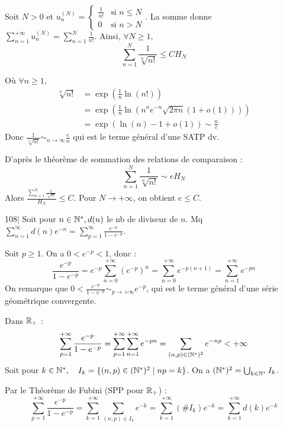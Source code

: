 \begin{solution}
Soit $N > 0$ et $u_n^{(N)} = \begin{cases} \frac{1}{n!} & \text{si } n \leq N \\ 0 & \text{si } n > N \end{cases}$.
La somme donne $\sum_{n=1}^{+\infty} u_n^{(N)} = \sum_{n=1}^N \frac{1}{n!}$.
Ainsi, $\forall N \geq 1$,
\[ \sum_{n=1}^N \frac{1}{\sqrt[n]{n!}} \leq C H_N \]

Où $\forall n \geq 1$, 
\begin{align*}
\sqrt[n]{n!} &= \exp\left(\frac{1}{n}\ln(n!)\right) \\
&= \exp\left(\frac{1}{n}\ln\left(n^n e^{-n} \sqrt{2\pi n} (1+o(1))\right)\right) \\
&= \exp\left( \ln(n) - 1 + o(1) \right) \sim \frac{n}{e}
\end{align*}
Donc $\frac{1}{\sqrt[n]{n!}} \sim_{n \to \infty} \frac{e}{n}$ qui est le terme général d'une SATP dv.

D'après le théorème de sommation des relations de comparaison :
\[ \sum_{n=1}^N \frac{1}{\sqrt[n]{n!}} \sim e H_N \]
Alors $\frac{\sum_{n=1}^N \frac{1}{\sqrt[n]{n!}}}{H_N} \leq C$.
Pour $N \to +\infty$, on obtient $\boxed{e \leq C}$.
\end{solution}


\begin{statementbox}
108| Soit pour $n \in \mathbb N^*, d(n)$ le nb de diviseur de $n$. Mq $\sum_{n=1}^\infty d(n)e^{-n} = \sum_{p=1}^\infty \frac{e^{-p}}{1-e^{-p}}$.
\end{statementbox}

\begin{solution}
Soit $p \geq 1$. On a $0 < e^{-p} < 1$, donc :
\[ \frac{e^{-p}}{1-e^{-p}} = e^{-p} \sum_{n=0}^{+\infty} (e^{-p})^n = \sum_{n=0}^{+\infty} e^{-p(n+1)} = \sum_{n=1}^{+\infty} e^{-pn} \]
On remarque que $0 < \frac{e^{-p}}{1-e^{-p}} \sim_{p \to +\infty} e^{-p}$, qui est le terme général d'une série géométrique convergente.

Dans $\mathbb R_+$ :
\[ \sum_{p=1}^{+\infty} \frac{e^{-p}}{1-e^{-p}} = \sum_{p=1}^{+\infty} \sum_{n=1}^{+\infty} e^{-pn} = \sum_{(n,p)\in(\mathbb N^*)^2} e^{-np} < +\infty \]
Soit pour $k \in \mathbb N^*, \quad I_k = \{(n,p) \in (\mathbb N^*)^2 \mid np = k\}$.
On a $(\mathbb N^*)^2 = \bigcup_{k \in \mathbb N^*} I_k$.

Par le Théorème de Fubini (SPP pour $\mathbb R_+$) :
\[ \sum_{p=1}^{+\infty} \frac{e^{-p}}{1-e^{-p}} = \sum_{k=1}^{+\infty} \sum_{(n,p) \in I_k} e^{-k} = \sum_{k=1}^{+\infty} (\# I_k) e^{-k} = \sum_{k=1}^{+\infty} d(k) e^{-k} \]
\end{solution}

